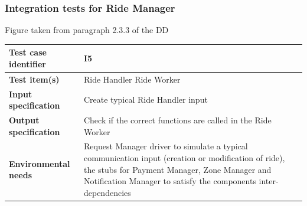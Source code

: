 \documentclass[a4paper,11pt]{report} %
\begin{document}
		\subsubsection{Integration tests for Ride Manager} \label{sec:3.1.3}
		\begin{minipage}{\linewidth}
		\end{minipage}
		\begin{center}
			Figure taken from paragraph 2.3.3 of the DD
		\end{center} 
		\begin{center}
			\renewcommand{\arraystretch}{1.2}
			\setlength{\tabcolsep}{24pt}
			\begin{tabular}{ l  p{9cm}}\hline
				\textbf{Test case identifier} & I5\\\hline
				\textbf{Test item(s)} & Ride Handler \textrightarrow Ride Worker\\\hline
				\textbf{Input specification} & Create typical Ride Handler input \\\hline
				\textbf{Output specification} & Check if the correct functions are called in the Ride Worker\\\hline
				\textbf{Environmental needs} & Request Manager driver to simulate a typical communication input (creation or modification of ride), the stubs for Payment Manager, Zone Manager and Notification Manager to satisfy the components inter-dependencies\\\hline
			\end{tabular}
		\end{center}	
		\bigskip	
\end{document}
